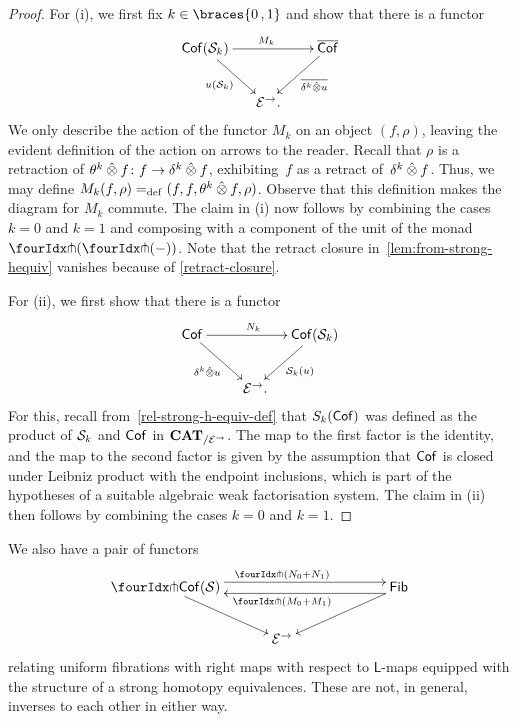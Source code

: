 \documentclass[reqno,10pt,a4paper,oneside,draft]{amsart}
\newcommand{\LL}{\mathsf{L}}
\begin{document}
{{\begin{proof} For (i), we first fix $k \in \braces{0 \, , 1 }$ and show that there is a functor
\begin{equation}
\label{lem:from-strong-hequiv}
\begin{gathered}
\xymatrix@!C@C-2em{
 \Cof( \cal{S}_k)
  \ar[dr]_{u(\cal{S}_k)}
  \ar[rr]^{M_k}
&&
  \overline{\Cof}
  \ar[dl]^-{\overline{\kcyl \hatotimes u}}
\\&
  \catE^\to
\rlap{.}}
\end{gathered}
\end{equation}
We only describe the action of the functor $M_k$ on an object $(f, \rho)$, leaving the evident definition of the action on arrows to the reader.
Recall that $\rho$ is a retraction of $\thetak \hatotimes f \co f \to \kcyl \hatotimes f$, exhibiting~$f$ as a retract of~$\kcyl \hatotimes f$.
Thus, we may define $M_k(f, \rho) \defeq (f, f, \thetak \hatotimes f, \rho)$.
Observe that this definition makes the diagram for $M_k$ commute. The claim in (i) now follows by combining 
the cases $k = 0$ and $k = 1$ and composing with a component of the unit of the monad $\liftl{(\liftr{(-)})}$.
Note that the retract closure in~\eqref{lem:from-strong-hequiv} vanishes because of \cref{retract-closure}.


For (ii), we first show that there is a functor
\[
\xymatrix@!C@C-2em{
  \Cof
  \ar[dr]_{\kcyl \hatotimes u} \ar[rr]^{N_k}
&&
  \Cof(\cal{S}_k)
  \ar[dl]^{\cal{S}_k(u)}
\\&
   \catE^\to
\rlap{.}}
\]
For this, recall from~\eqref{rel-strong-h-equiv-def} that $S_k(\Cof)$ was defined as the product of $\cal{S}_k$ and $\Cof$  
in $\CAT_{/\cal{E}^\to}$. The map to the first factor is the identity, and the map to the second factor is given by the assumption that $\Cof$ is closed under Leibniz product with the endpoint inclusions, which is part of the hypotheses of a suitable algebraic weak factorisation system.
The claim in (ii) then follows by combining the cases $k = 0$ and $k = 1$.
\end{proof}



\begin{remark} \label{relating-strong-hequiv-and-uniform-fib}
We also have a pair of functors
\[
\xymatrix@!C@C-2.5em{
  \liftr{\Cof(\cal{S})}
  \ar[dr]
  \ar@<4pt>[rr]^{\liftr{(N_0 + N_1)}}
&&
   \Fib
  \ar[dl]
  \ar@<4pt>[ll]^{\liftr{(M_0 + M_1)}}
\\&
  \catE^\to
}
\]
relating uniform fibrations with right maps with respect to $\LL$-maps equipped with the structure of 
a strong homotopy equivalences. These are not, in general, inverses to each other in either way.
\end{remark}

}}
\end{document}
